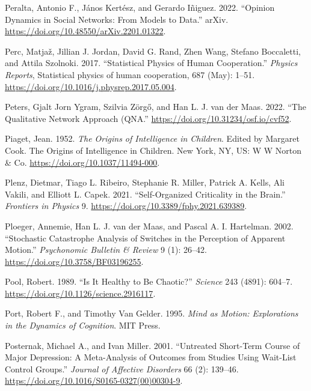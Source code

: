 \documentclass[
  a4paper,
  DIV=11,
  numbers=noendperiod,
  oneside]{scrreprt}
\newlength{\cslhangindent}
\newenvironment{CSLReferences}[2] %
 {\begin{list}{}{%
  \setlength{\itemindent}{0pt}
  \setlength{\leftmargin}{0pt}
  \setlength{\parsep}{0pt}
  \ifodd #1
   \setlength{\leftmargin}{\cslhangindent}
   \setlength{\itemindent}{-1\cslhangindent}
  \fi
  \setlength{\itemsep}{#2\baselineskip}}}
 {\end{list}}
\begin{document}
\begin{CSLReferences}{1}{0}
Peralta, Antonio F., János Kertész, and Gerardo Iñiguez. 2022.
{``Opinion Dynamics in Social Networks: {From} Models to Data.''}
{arXiv}. \url{https://doi.org/10.48550/arXiv.2201.01322}.

Perc, Matjaž, Jillian J. Jordan, David G. Rand, Zhen Wang, Stefano
Boccaletti, and Attila Szolnoki. 2017. {``Statistical Physics of Human
Cooperation.''} \emph{Physics Reports}, Statistical physics of human
cooperation, 687 (May): 1--51.
\url{https://doi.org/10.1016/j.physrep.2017.05.004}.

Peters, Gjalt Jorn Ygram, Szilvia Zörgő, and Han L. J. van der Maas.
2022. {``The {Qualitative Network Approach} ({QNA}.''}
\url{https://doi.org/10.31234/osf.io/cvf52}.

Piaget, Jean. 1952. \emph{The Origins of Intelligence in Children}.
Edited by Margaret Cook. The Origins of Intelligence in Children. {New
York, NY, US}: {W W Norton \& Co}.
\url{https://doi.org/10.1037/11494-000}.

Plenz, Dietmar, Tiago L. Ribeiro, Stephanie R. Miller, Patrick A. Kells,
Ali Vakili, and Elliott L. Capek. 2021. {``Self-{Organized Criticality}
in the {Brain}.''} \emph{Frontiers in Physics} 9.
\url{https://doi.org/10.3389/fphy.2021.639389}.

Ploeger, Annemie, Han L. J. van der Maas, and Pascal A. I. Hartelman.
2002. {``Stochastic Catastrophe Analysis of Switches in the Perception
of Apparent Motion.''} \emph{Psychonomic Bulletin \& Review} 9 (1):
26--42. \url{https://doi.org/10.3758/BF03196255}.

Pool, Robert. 1989. {``Is {It Healthy} to {Be Chaotic}?''}
\emph{Science} 243 (4891): 604--7.
\url{https://doi.org/10.1126/science.2916117}.

Port, Robert F., and Timothy Van Gelder. 1995. \emph{Mind as {Motion}:
{Explorations} in the {Dynamics} of {Cognition}}. {MIT Press}.

Posternak, Michael A., and Ivan Miller. 2001. {``Untreated Short-Term
Course of Major Depression: A Meta-Analysis of Outcomes from Studies
Using Wait-List Control Groups.''} \emph{Journal of Affective Disorders}
66 (2): 139--46. \url{https://doi.org/10.1016/S0165-0327(00)00304-9}.


\end{CSLReferences}
\end{document}
